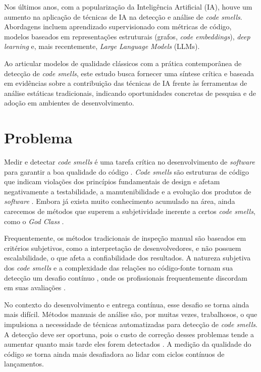 Nos últimos anos, com a popularização da Inteligência Artificial (IA), houve um aumento na aplicação de técnicas de IA na detecção e análise 
de \textit{code smells}. Abordagens incluem aprendizado supervisionado com métricas de código, modelos baseados em 
representações estruturais (grafos, \textit{code embeddings}), \textit{deep learning} e, mais recentemente, 
\textit{Large Language Models} (LLMs).

Ao articular modelos de qualidade clássicos com a prática contemporânea de detecção de \textit{code smells}, 
este estudo busca fornecer uma síntese crítica e baseada em evidências sobre a contribuição das técnicas de IA frente às ferramentas de análise estáticas tradicionais, 
indicando oportunidades concretas de pesquisa e de adoção em ambientes de desenvolvimento.

\section{Problema}

Medir e detectar \textit{code smells} é uma tarefa crítica no desenvolvimento de \textit{software} para 
garantir a boa qualidade do código \cite{Haroon2025}. \textit{Code smells} são estruturas de código que indicam 
violações dos princípios fundamentais de design \cite{Fowler2018} e afetam negativamente a testabilidade, a 
manutenibilidade e a evolução dos produtos de \textit{software} \cite{SharmaSpinellis2018}. Embora já exista
muito conhecimento acumulado na área, ainda carecemos de métodos que superem a subjetividade inerente a 
certos \textit{code smells}, como o \textit{God Class} \cite{Haroon2025}.

Frequentemente, os métodos tradicionais de inspeção manual são baseados em critérios subjetivos, como a 
interpretação de desenvolvedores, e não possuem escalabilidade, o que afeta a confiabilidade dos resultados. 
A natureza subjetiva dos \textit{code smells} e a complexidade das relações no código-fonte tornam sua detecção um 
desafio contínuo \cite{AlKhatib2023}, onde os profissionais frequentemente discordam em suas avaliações
\cite{ArcelliFontana2016}.

No contexto do desenvolvimento e entrega contínua, esse desafio se torna ainda mais difícil. Métodos manuais 
de análise são, por muitas vezes, trabalhosos, o que impulsiona a necessidade de técnicas automatizadas para 
detecção de \textit{code smells}. A detecção deve ser oportuna, pois o custo de correção desses problemas tende a 
aumentar quanto mais tarde eles forem detectados \cite{Moha2009}. A medição da qualidade do código se torna 
ainda mais desafiadora ao lidar com ciclos contínuos de lançamentos.

